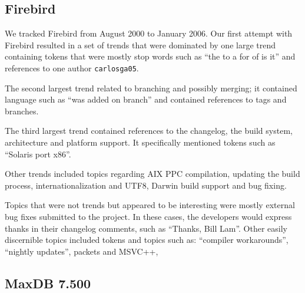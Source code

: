 \documentclass[times, 10pt,twocolumn]{article}
\begin{document}


\subsection{Firebird}


We tracked Firebird from August 2000 to January 2006.
Our first attempt with Firebird resulted in a set of trends that were
dominated by one large trend containing tokens that were mostly stop
words such as ``the to a for of is it'' and references to one author
\texttt{carlosga05}. 

The second largest trend related to branching and possibly merging; it
contained language such as ``was added on branch'' and contained
references to tags and branches.

The third largest trend contained references to the changelog, the
build system, architecture and platform support. It specifically
mentioned tokens such as ``Solaris port x86''.

Other trends included topics regarding AIX PPC compilation, updating
the build process, internationalization and UTF8, Darwin build support
and bug fixing.

Topics that were not trends but appeared to be  interesting were mostly external bug
fixes submitted to the project.
 In these cases, the developers would express thanks in their changelog comments, such as ``Thanks, Bill Lam''.  Other easily discernible topics included 
 tokens and topics such as: ``compiler workarounds'', ``nightly updates'', packets and MSVC++, 

\subsection{MaxDB 7.500}



\end{document}
